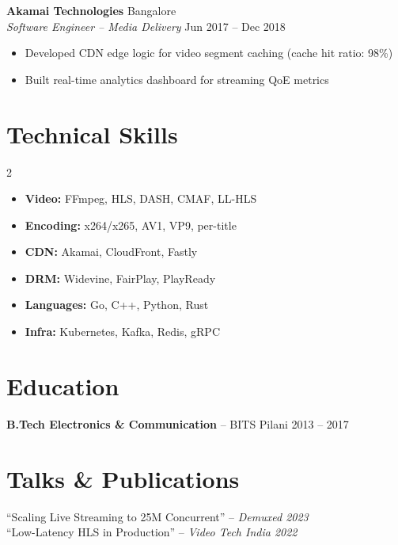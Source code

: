 \documentclass[10pt,letterpaper]{article}
\begin{document}
\textbf{Akamai Technologies} \hfill Bangalore\\
\textit{Software Engineer -- Media Delivery} \hfill Jun 2017 -- Dec 2018
\begin{itemize}
\item Developed CDN edge logic for video segment caching (cache hit ratio: 98\%)
\item Built real-time analytics dashboard for streaming QoE metrics
\end{itemize}

\section{Technical Skills}
\begin{multicols}{2}
\begin{itemize}[label=\color{mediared}]
\item \textbf{Video:} FFmpeg, HLS, DASH, CMAF, LL-HLS
\item \textbf{Encoding:} x264/x265, AV1, VP9, per-title
\item \textbf{CDN:} Akamai, CloudFront, Fastly
\item \textbf{DRM:} Widevine, FairPlay, PlayReady
\item \textbf{Languages:} Go, C++, Python, Rust
\item \textbf{Infra:} Kubernetes, Kafka, Redis, gRPC
\end{itemize}
\end{multicols}

\section{Education}
\textbf{B.Tech Electronics \& Communication} -- BITS Pilani \hfill 2013 -- 2017

\section{Talks \& Publications}
\hspace{4pt} ``Scaling Live Streaming to 25M Concurrent'' -- \textit{Demuxed 2023}\\
\hspace{4pt} ``Low-Latency HLS in Production'' -- \textit{Video Tech India 2022}
\end{document}
